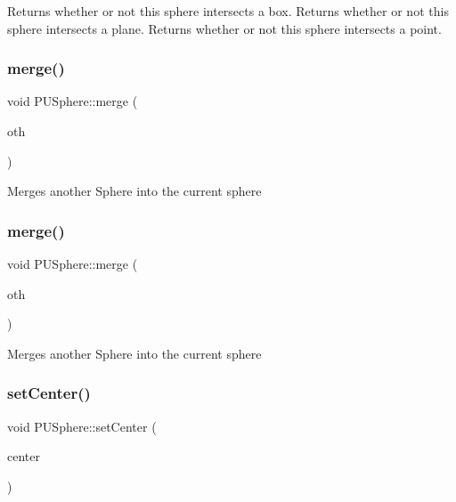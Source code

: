 Returns whether or not this sphere intersects a box. Returns whether or not this sphere intersects a plane. Returns whether or not this sphere intersects a point. \mbox{\label{classPUSphere_aa327bfa3036b8f9b0c61127502038f48}} 
\subsubsection{\texorpdfstring{merge()}{merge()}\hspace{0.1cm}{\footnotesize\ttfamily [1/2]}}
{\footnotesize\ttfamily void P\+U\+Sphere\+::merge (\begin{DoxyParamCaption}\item[{const \hyperlink{classPUSphere}{P\+U\+Sphere} \&}]{oth }\end{DoxyParamCaption})}

Merges another Sphere into the current sphere \mbox{\label{classPUSphere_aa327bfa3036b8f9b0c61127502038f48}} 
\subsubsection{\texorpdfstring{merge()}{merge()}\hspace{0.1cm}{\footnotesize\ttfamily [2/2]}}
{\footnotesize\ttfamily void P\+U\+Sphere\+::merge (\begin{DoxyParamCaption}\item[{const \hyperlink{classPUSphere}{P\+U\+Sphere} \&}]{oth }\end{DoxyParamCaption})}

Merges another Sphere into the current sphere \mbox{\label{classPUSphere_ae656af3bcf247af6b4c21b303e543441}} 
\subsubsection{\texorpdfstring{set\+Center()}{setCenter()}\hspace{0.1cm}{\footnotesize\ttfamily [1/2]}}
{\footnotesize\ttfamily void P\+U\+Sphere\+::set\+Center (\begin{DoxyParamCaption}\item[{const \hyperlink{classVec3}{Vec3} \&}]{center }\end{DoxyParamCaption})\hspace{0.3cm}{\ttfamily [inline]}}


